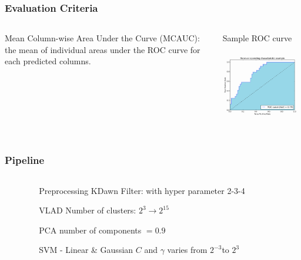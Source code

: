 \documentclass{beamer}
\begin{document}
\begin{frame}
\frametitle{Evaluation Criteria}
\begin{columns}[T]
\begin{column}{.5\textwidth}
Mean Column-wise Area Under the Curve (MCAUC): the mean of individual areas under the ROC curve for each predicted columns.

\end{column}
\begin{column}{.5\textwidth}
\begin{center}
Sample ROC curve 
\includegraphics[height=1.5in]{9NpXJ.png}
\end{center}
\end{column}
\end{columns}


\end{frame}



\begin{frame}


\frametitle{Pipeline}
\begin{columns}[T]
\begin{column}{.1\textwidth}

\end{column}
\begin{column}{.8\textwidth}
\begin{block}{Preprocessing}
KDawn Filter: with hyper parameter 2-3-4 
\end{block}

\begin{block}{VLAD}
Number of clusters: $2^3\rightarrow 2^{15}$ 
\end{block}

\begin{block}{PCA}
number of components $=0.9$
\end{block}

\begin{block}{SVM - Linear \& Gaussian}
$C$ and $\gamma$ varies from $2^{-3}$to $ 2^{3}$ 
\end{block}
\end{column} 
\begin{column}{.1\textwidth}

\end{column}
\end{columns}
\end{frame}
\end{document}
